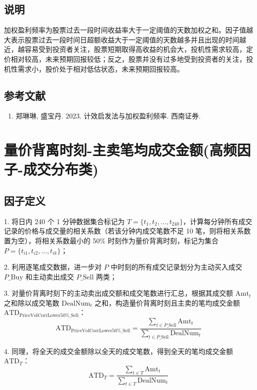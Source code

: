 \documentclass{article}
\begin{document}
\subsection{说明}
加权盈利频率为股票过去一段时间收益率大于一定阈值的天数加权之和。因子值越大表示股票过去一段时间日超额收益大于一定阈值的天数越多并且出现的时间越近，越容易受到投资者关注，股票短期取得高收益的机会大，投机性需求较高，定价相对较高，未来预期回报较低；反之，股票并没有过多地受到投资者的关注，投机性需求小，股价处于相对低估状态，未来预期回报较高。

\subsection{参考文献}
\begin{enumerate}
    \item 郑琳琳, 盛宝丹. 2023. 计效启发法与加权盈利频率. 西南证券.
\end{enumerate}

\section{量价背离时刻-主卖笔均成交金额(高频因子-成交分布类)}

\subsection{因子定义}

1. 将日内 240 个 1 分钟数据集合标记为 \( T = \{t_1, t_2, \dots, t_{240}\} \)，计算每分钟所有成交记录的价格与成交量的相关系数（若该分钟内成交笔数不足 10 笔，则将相关系数置为空），将相关系数最小的 50\% 时刻作为量价背离时刻，标记为集合 \( P = \{t_{i1}, t_{i2}, \dots, t_{ik}\} \)；

2. 利用逐笔成交数据，进一步对 \( P \) 中时刻的所有成交记录划分为主动买入成交 \( P\_\mathrm{Buy} \) 和主动卖出成交 \( P\_\mathrm{Sell} \) 两类；

3. 对量价背离时刻下的主动卖出成交额和成交笔数进行汇总，根据其成交额 \( \mathrm{Amt}_t \) 之和除以成交笔数 \( \mathrm{DealNum}_t \) 之和，构造量价背离时刻且主卖的笔均成交金额 \( \mathrm{ATD}_{\mathrm{PriceVolCorrLower50\%\_Sell}} \)：
\begin{equation}
    \mathrm{ATD}_{\mathrm{PriceVolCorrLower50\%\_Sell}} = \frac{\sum_{t \in P\_\mathrm{Sell}} \mathrm{Amt}_t}{\sum_{t \in P\_\mathrm{Sell}} \mathrm{DealNum}_t}
\end{equation}

4. 同理，将全天的成交金额除以全天的成交笔数，得到全天的笔均成交金额 \( \mathrm{ATD}_T \)：
\begin{equation}
    \mathrm{ATD}_T = \frac{\sum_{t \in T} \mathrm{Amt}_t}{\sum_{t \in T} \mathrm{DealNum}_t}
\end{equation}
\end{document}

